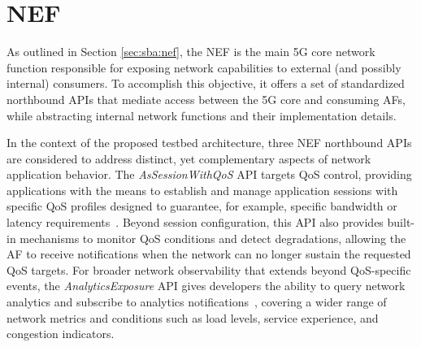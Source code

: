 \section{\acs{NEF}}
\label{chap:proposal:exposure:nef}

As outlined in Section \ref{sec:sba:nef}, the \acf{NEF} is the main \acs{5G} core network function responsible for exposing network capabilities to external (and possibly internal) consumers. To accomplish this objective, it offers a set of standardized northbound \acsp{API} that mediate access between the \acs{5G} core and consuming \acsp{AF}, while abstracting internal network functions and their implementation details.

In the context of the proposed testbed architecture, three \acs{NEF} northbound \acsp{API} are considered to address distinct, yet complementary aspects of network application behavior. The \textit{AsSessionWithQoS} \acs{API} targets \acs{QoS} control, providing applications with the means to establish and manage application sessions with specific \acs{QoS} profiles designed to guarantee, for example, specific bandwidth or latency requirements~\cite{ETSI_TS_129_122_V18_8_0}. Beyond session configuration, this \acs{API} also provides built-in mechanisms to monitor \acs{QoS} conditions and detect degradations, allowing the \acs{AF} to receive notifications when the network can no longer sustain the requested \acs{QoS} targets. For broader network observability that extends beyond \acs{QoS}-specific events, the \textit{AnalyticsExposure} \acs{API} gives developers the ability to query network analytics and subscribe to analytics notifications~\cite{ETSI_TS_129_522_V18_11_0}, covering a wider range of network metrics and conditions such as load levels, service experience, and congestion indicators.


